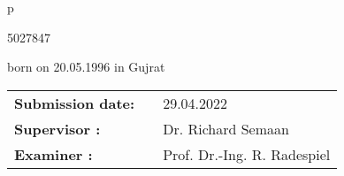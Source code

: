 \begin{center}
\begin{tabular}{p{\textwidth}}
\begin{center}
      \large{5027847} \\
      \end{center}
      
      \begin{center}
      \large{born on 20.05.1996 in Gujrat}
      \end{center}
      
      \vspace{3cm}  
      \begin{center}
      \begin{tabular}{lll}
      \textbf{Submission date:} & & 29.04.2022\\
      \textbf{Supervisor :} & & Dr. Richard Semaan \\
      \textbf{Examiner :} & & Prof. Dr.-Ing. R. Radespiel\\
      
      
      \end{tabular}
      \end{center}
      
      \end{tabular}
      \end{center}
      \thispagestyle{empty}




      